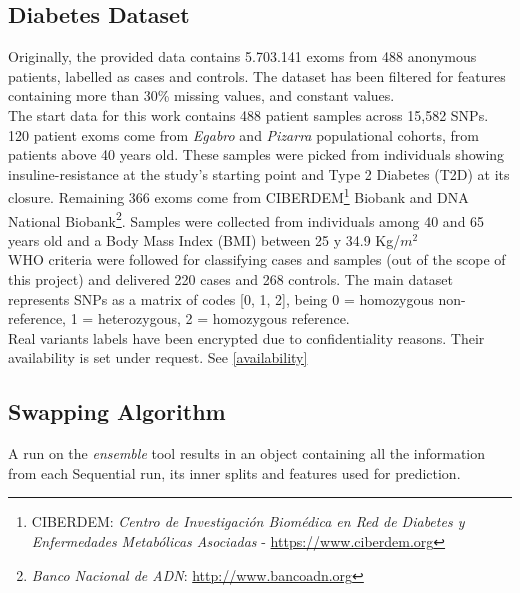 \subsection{Diabetes Dataset}
Originally, the provided data contains 5.703.141 exoms from 488 anonymous patients, labelled as cases and controls. The dataset has been filtered for features containing more than 30\% missing values, and constant values.
\\

The start data for this work contains 488 patient samples across 15,582 SNPs. 120 patient exoms come from \emph{Egabro} and \emph{Pizarra} populational cohorts, from patients above 40 years old. These samples were picked from individuals showing insuline-resistance at the study's starting point and Type 2 Diabetes (T2D) at its closure. Remaining 366 exoms come from CIBERDEM\footnote{CIBERDEM: \emph{Centro de Investigación Biomédica en Red de Diabetes y Enfermedades Metabólicas Asociadas} - \url{https://www.ciberdem.org}} Biobank and DNA National Biobank\footnote{\emph{Banco Nacional de ADN}: \url{http://www.bancoadn.org}}. Samples were collected from individuals among 40 and 65 years old and a Body Mass Index (BMI) between 25 y 34.9 Kg/$m^{2}$
\\

WHO criteria were followed for classifying cases and samples (out of the scope of this project) and delivered 220 cases and 268 controls. The main dataset represents SNPs as a matrix of codes [0, 1, 2], being 0 = homozygous non-reference, 1 = heterozygous, 2 = homozygous reference. 
\\

Real variants labels have been encrypted due to confidentiality reasons. Their availability is set under request. See \ref{availability}



\subsection{Swapping Algorithm}
\label{section:methods:pipeline}
A run on the \emph{ensemble} tool results in an object containing all the information from each Sequential run, its inner splits and features used for prediction.
\\

